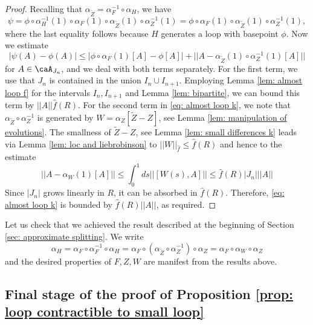 \begin{proof}
	Recalling that $\alpha_{\widetilde Z}=\alpha_{F}^{-1} \circ \alpha_H$, we have
	$$\psi= \phi \circ \alpha_{H}^{-1}(1) \circ \alpha_{F}(1) \circ \alpha_{\widetilde Z}(1) \circ 
	\alpha_{Z}^{-1}(1)= \phi \circ \alpha_{F}(1) \circ \alpha_{\widetilde Z}(1) \circ 
	\alpha_{Z}^{-1}(1),
	$$
	where the last equality follows because $H$ generates a loop with basepoint $\phi$. 
	Now we estimate
	\begin{equation}\label{eq: almost loop k}
	|\psi(A)-\phi(A)| \leq    |\phi \circ \alpha_{F}(1)[A]-\phi[A]| +   ||  A- \alpha_{\widetilde Z}(1) \circ 
	\alpha_{Z}^{-1}(1)[A] ||
	\end{equation}
	for $A\in\caA_{J_n}$, and we deal with both terms separately. For the first term, we use that $J_n$ is contained in the union $I_n \cup I_{n+1}$. Employing Lemma  \ref{lem: almost loop f} for the intervals $I_n,I_{n+1}$ and Lemma \ref{lem: bipartite}, we can bound this term by $||A || \hat{f}(R)$.
	For the second term in \eqref{eq: almost loop k}, we note that $\alpha_{\widetilde Z} \circ 
	\alpha_{Z}^{-1}$ is generated by $W= \alpha_Z[\widetilde Z - Z]$, see Lemma \ref{lem: manipulation of evolutions}. The smallness of $\widetilde Z - Z$, see Lemma 
	\ref{lem: small differences k} leads via Lemma \ref{lem: loc and liebrobinson} to  $||W||_{\hat{f}}\leq \hat{f}(R)$ and hence  to the estimate
	$$
	||  A- \alpha_{W}(1)[A] || \leq \int_0^1 ds  ||  [W(s), A]||  \leq    \hat{f}(R)  |J_n| || A ||
	$$
	Since $|J_n|$ grows linearly in $R$, it can be absorbed in $\hat{f}(R)$. Therefore, \eqref{eq: almost loop k} is bounded by $\hat{f}(R) ||A||$, as required. 
\end{proof}

Let us check that we achieved the result described at the beginning of Section \ref{sec: approximate splitting}. We write
\begin{equation}\label{First Splitting Loop}
\alpha_H=   \alpha_{F} \circ  \alpha_{F}^{-1} \circ \alpha_H = \alpha_{F} \circ  \left(\alpha_{\widetilde Z} \circ \alpha^{-1}_Z\right) \circ \alpha_Z =  \alpha_{F} \circ  \alpha_{W} \circ \alpha_Z
\end{equation}
and the desired properties of  $F,Z,W$ are manifest from the results above. 




\subsection{Final stage of the proof of Proposition \ref{prop: loop contractible to small loop}} \label{sec: final stage proof}


